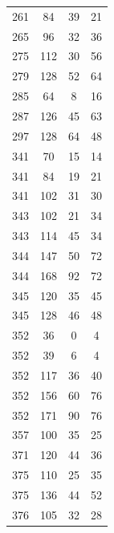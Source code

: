 \documentclass[12pt]{amsproc} %
\theoremstyle{definition}\newtheorem{defn}[thm]{Definition}
\theoremstyle{definition}\newtheorem{rem}[thm]{Remark}
\theoremstyle{definition}\newtheorem{ex}[thm]{Example}
\begin{document}
\begin{table}[ht!]
\begin{minipage}{0.25\textwidth}
\begin{tabular}{c|c|c|c}
      261&84&39&21\\ 
      265&96&32&36\\ 
      275&112&30&56\\ 
      279&128&52&64\\ 
      285&64&8&16\\ 
      287&126&45&63\\ 
      297&128&64&48\\
      341&70&15&14\\ 
      341&84&19&21\\ 
      341&102&31&30\\ 
      343&102&21&34\\ 
      343&114&45&34\\ 
      344&147&50&72\\ 
      344&168&92&72\\ 
      345&120&35&45\\ 
      345&128&46&48\\ 
      352&36&0&4\\ 
      352&39&6&4\\ 
      352&117&36&40\\ 
      352&156&60&76\\ 
      352&171&90&76\\ 
      357&100&35&25\\ 
      371&120&44&36\\ 
      375&110&25&35\\ 
      375&136&44&52\\ 
      376&105&32&28\\ 
            \end{tabular}
    \end{minipage}
\end{table}
\end{document}
